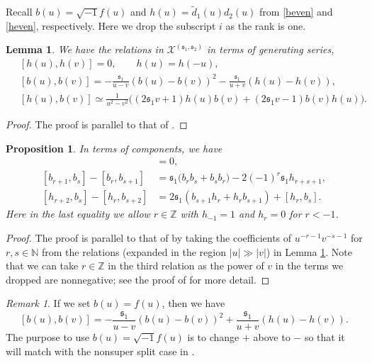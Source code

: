 \documentclass[11pt,reqno]{amsart}
\numberwithin{equation}{section}
\newtheorem{prop}[thm]{Proposition}
\newtheorem{lem}[thm]{Lemma}
\theoremstyle{definition}
\theoremstyle{remark}
\newtheorem{rem}[thm]{Remark}
\newcommand{\bZ}{\mathbb{Z}}
\newcommand{\bN}{\mathbb{N}}
\newcommand{\tl}{\tilde}
\newcommand{\ka}{{\mathfrak s}}
\newcommand{\scrX}{{\mathscr{X}}}
\begin{document}
Recall $b(u)=\sqrt{-1}f(u)$ and $h(u)=\tl d_1(u)d_2(u)$ from \eqref{beven} and \eqref{heven}, respectively. Here we drop the subscript $i$ as the rank is one. 

\begin{lem}\label{b2s}
We have the relations in $\scrX^{(\ka_1,\ka_2)}$ in terms of generating series,
\begin{align*}
&[h(u),h(v)]=0,\qquad h(u)=h(-u),\\
&[b(u),b(v)]=-\frac{\ka_1}{u-v}(b(u)-b(v))^2-\frac{\ka_1}{u+v}(h(u)-h(v)),\\\
&[h(u),b(v)]\simeq\frac{1}{u^2-v^2}\big((2\ka_1v+1)h(u)b(v)+(2\ka_1v-1)b(v)h(u)\big).
\end{align*}
\end{lem}
\begin{proof}
The proof is parallel to that of \cite[Lem. 4.2]{Lu2023drinfeld}.
\end{proof}

\begin{prop}\label{propx=2}
In terms of components, we have
\begin{align*}
[h_r,h_s] &=0,\\
[b_{r+1},b_s]-[b_r,b_{s+1}] &=\ka_1\big(b_rb_s+b_sb_r\big)-2(-1)^r\ka_1h_{r+s+1},\\
[h_{r+2},b_s]-[h_r,b_{s+2}] &=2\ka_1(b_{s+1}h_r+h_rb_{s+1})+[h_r,b_s].
\end{align*}
Here in the last equality we allow $r\in\bZ$ with $h_{-1}=1$ and $h_{r}=0$ for $r<-1$.
\end{prop}
\begin{proof}
The proof is parallel to that of  \cite[Prop. 4.3]{Lu2023drinfeld} by taking the coefficients of $u^{-r-1}v^{-s-1}$ for $r,s\in\bN$ from the relations (expanded in the region $|u|\gg |v|$) in Lemma \ref{b2s}. Note that we can take $r\in\bZ$ in the third relation as the power of $v$ in the terms we dropped are nonnegative; see the
proof of \cite[Prop. 7.16]{lu2024drinfeld} for more detail.
\end{proof}
\begin{rem}
If we set $b(u)=f(u)$, then we have
\[
[b(u),b(v)]=-\frac{\ka_1}{u-v}(b(u)-b(v))^2 + \frac{\ka_1}{u+v}(h(u)-h(v)).
\]
The purpose to use $b(u)=\sqrt{-1}f(u)$ is to change $+$ above to $-$ so that it will match with the nonsuper split case in \cite{Lu2023drinfeld}.
\end{rem}
\end{document}
